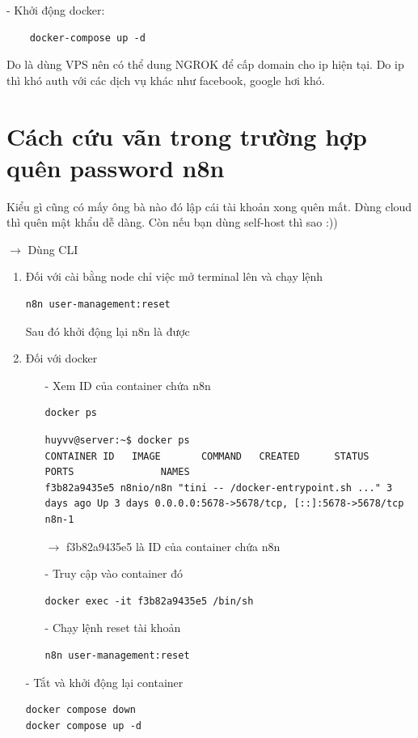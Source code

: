 - Khởi động docker: 

\begin{lstlisting}
    docker-compose up -d
\end{lstlisting}

Do là dùng VPS nên có thể dung NGROK để cấp domain cho ip hiện tại. Do ip thì khó auth với các dịch vụ khác như facebook, google hơi khó.

\section{Cách cứu vãn trong trường hợp quên password n8n}

Kiểu gì cũng có mấy ông bà nào đó lập cái tài khoản xong quên mất. Dùng cloud thì quên mật khẩu dễ dàng. Còn nếu bạn dùng self-host thì sao :))

$\rightarrow$ Dùng CLI 

\begin{enumerate}
    \item Đối với cài bằng node chỉ việc mở terminal lên và chạy lệnh

\begin{lstlisting}[language = Bash]
n8n user-management:reset
\end{lstlisting}

Sau đó khởi động lại n8n là được

    \item Đối với docker

\begin{itemize}
    \item[-] Xem ID của container chứa n8n
\begin{lstlisting}
docker ps
\end{lstlisting}

\begin{lstlisting}
huyvv@server:~$ docker ps
CONTAINER ID   IMAGE       COMMAND   CREATED      STATUS      PORTS               NAMES
f3b82a9435e5 n8nio/n8n "tini -- /docker-entrypoint.sh ..." 3 days ago Up 3 days 0.0.0.0:5678->5678/tcp, [::]:5678->5678/tcp n8n-1
\end{lstlisting}


$\rightarrow$ f3b82a9435e5 là ID của container chứa n8n

\item[-] Truy cập vào container đó
\begin{lstlisting}
docker exec -it f3b82a9435e5 /bin/sh
\end{lstlisting}

\item[-] Chạy lệnh reset tài khoản
\begin{lstlisting}
n8n user-management:reset
\end{lstlisting}
\end{itemize}
\item[-] Tắt và khởi động lại container
\begin{lstlisting}
docker compose down
docker compose up -d
\end{lstlisting}
\end{enumerate}






